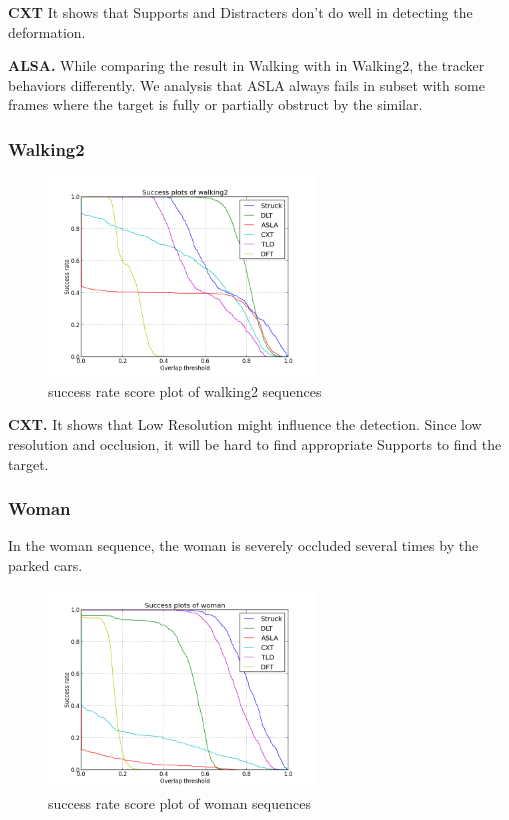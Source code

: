 \documentclass{acm_proc_article-sp}
\begin{document}
\textbf{CXT} It shows that Supports and Distracters don't do well in detecting the deformation.

\textbf{ALSA.} While comparing the result in Walking with in Walking2, the tracker behaviors differently. We analysis that ASLA always fails in subset with some frames where the target is fully or partially obstruct by the similar. 

\subsubsection{Walking2}

\begin{figure}[hbt]
    \centering
    \includegraphics[width=200pt]{walking2}
    \caption{success rate score plot of walking2 sequences}
    \label{fig:walking2}
\end{figure}

\textbf{CXT.} It shows that Low Resolution might influence the detection. Since low resolution and occlusion, it will be hard to find appropriate Supports to find the target.

\subsubsection{Woman}

In the woman sequence, the woman is severely occluded several times by the parked cars.

\begin{figure}[hbt]
	\centering
	\includegraphics[width=200pt]{woman}
	\caption{success rate score plot of woman sequences}
	\label{fig:woman}
\end{figure}
\end{document}
